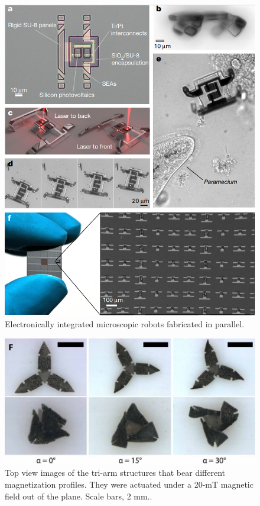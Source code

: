 \documentclass[journal,svgnames,twocolumn,x11names]{IEEEtran}
\begin{document}
\begin{figure}[htbp]
    \centering
    \includegraphics[width=.48\textwidth]{laser.PNG}
    \caption{Electronically integrated microscopic robots fabricated in parallel\cite{Miskin2020}.}
    \label{laser}
\end{figure}

\begin{figure}[htbp]
    \centering
    \includegraphics[width=.48\textwidth]{magnetic.PNG}
    \caption{Top view images of the tri-arm structures that bear different magnetization profiles. They were actuated under a 20-mT magnetic field out of the plane. Scale bars, 2 mm.\cite{Xu2019}.}
    \label{magnetic}
    \vspace{-0.8cm}
\end{figure}
\end{document}
